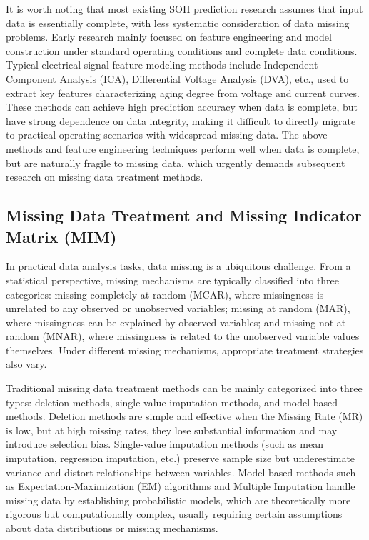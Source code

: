 \documentclass[10pt,a4paper]{article}
\begin{document}
It is worth noting that most existing SOH prediction research assumes that input data is essentially complete, with less systematic consideration of data missing problems\cite{shao2025soh,deng2025novel}. Early research mainly focused on feature engineering and model construction under standard operating conditions and complete data conditions. Typical electrical signal feature modeling methods include Independent Component Analysis (ICA), Differential Voltage Analysis (DVA), etc., used to extract key features characterizing aging degree from voltage and current curves\cite{deng2025novel}. These methods can achieve high prediction accuracy when data is complete, but have strong dependence on data integrity, making it difficult to directly migrate to practical operating scenarios with widespread missing data. The above methods and feature engineering techniques perform well when data is complete, but are naturally fragile to missing data, which urgently demands subsequent research on missing data treatment methods.

\subsection{Missing Data Treatment and Missing Indicator Matrix (MIM)}

In practical data analysis tasks, data missing is a ubiquitous challenge. From a statistical perspective, missing mechanisms are typically classified into three categories: missing completely at random (MCAR), where missingness is unrelated to any observed or unobserved variables; missing at random (MAR), where missingness can be explained by observed variables; and missing not at random (MNAR), where missingness is related to the unobserved variable values themselves\cite{little2002statistical}. Under different missing mechanisms, appropriate treatment strategies also vary.

Traditional missing data treatment methods can be mainly categorized into three types: deletion methods, single-value imputation methods, and model-based methods. Deletion methods are simple and effective when the Missing Rate (MR) is low, but at high missing rates, they lose substantial information and may introduce selection bias. Single-value imputation methods (such as mean imputation, regression imputation, etc.) preserve sample size but underestimate variance and distort relationships between variables. Model-based methods such as Expectation-Maximization (EM) algorithms and Multiple Imputation handle missing data by establishing probabilistic models, which are theoretically more rigorous but computationally complex, usually requiring certain assumptions about data distributions or missing mechanisms.
\end{document}
